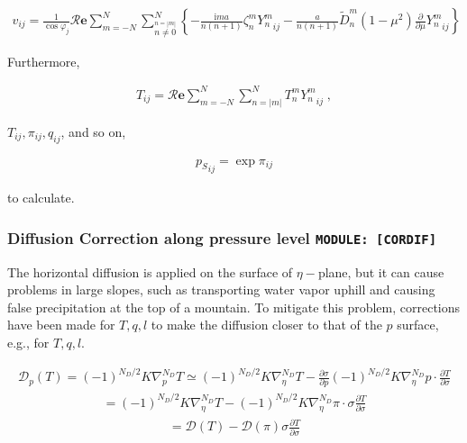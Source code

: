 \begin{eqnarray}
  v_{ij}
  =  \frac{1}{\cos \varphi_j}
     {\mathcal R}{\mathbf{e}} \sum_{m=-N}^{N}
                       \sum_{\stackrel{n=|m|}{n \neq 0}}^{N}
    \left\{
          -  \frac{\mathrm{i}m a}{n(n+1)} \zeta_n^m  {Y_n^m}_{ij}
          -  \frac{a}{n(n+1)} \tilde{D}_n^m
            (1-\mu^{2}) \frac{\partial{}}{\partial {\mu}} {Y_n^m}_{ij}
    \right\}
\end{eqnarray}

Furthermore,

\begin{eqnarray}
  T_{ij}
   =  {\mathcal R}{\mathbf{e}} \sum_{m=-N}^{N} \sum_{n=|m|}^{N}
      T_n^m  {Y_n^m}_{ij} \; ,
\end{eqnarray}

\(T_{ij}, \pi_{ij}, q_{ij}\), and so on,

\begin{eqnarray}
  {p_S}_{ij} = \exp \pi_{ij}
\end{eqnarray}

to calculate.

\hypertarget{diffusion-correction-along-pressure-level-module-cordif}{%
\subsubsection{\texorpdfstring{Diffusion Correction along pressure level
\texttt{MODULE:\ {[}CORDIF{]}}}{Diffusion Correction along pressure level MODULE: {[}CORDIF{]}}}\label{diffusion-correction-along-pressure-level-module-cordif}}

The horizontal diffusion is applied on the surface of \(\eta-\)plane,
but it can cause problems in large slopes, such as transporting water
vapor uphill and causing false precipitation at the top of a mountain.
To mitigate this problem, corrections have been made for \(T,q,l\) to
make the diffusion closer to that of the \(p\) surface, e.g., for
\(T,q,l\).

\begin{eqnarray}
  {\mathcal D}_p (T) = (-1)^{N_D/2} K \nabla^{N_D}_p T  
                \simeq  (-1)^{N_D/2} K \nabla^{N_D}_{\eta} T  
                      - \frac{\partial{\sigma}}{\partial {p}} 
                      (-1)^{N_D/2} K \nabla^{N_D}_{\eta} p
                      \cdot \frac{\partial{T}}{\partial {\sigma}}
\end{eqnarray} \begin{eqnarray}
                =      (-1)^{N_D/2} K \nabla^{N_D}_{\eta} T  
                    -  (-1)^{N_D/2} K \nabla^{N_D}_{\eta} \pi
                          \cdot \sigma \frac{\partial{T}}{\partial {\sigma}}
\end{eqnarray} \begin{eqnarray}
                =    {\mathcal D} (T) 
                    -  {\mathcal D} (\pi) 
                       \sigma \frac{\partial{T}}{\partial {\sigma}}
\end{eqnarray}

